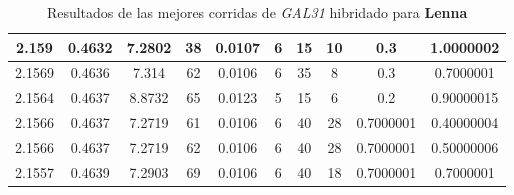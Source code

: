 \begin{table}[h!]
\begin{center}
\begin{tabular}{|c|c|c|c|c|c|c|c|c|c|}
        \hline
        \hline
            2.159 & 0.4632  & 7.2802 & 38 & 0.0107 & 6 & 15 & 10 & 0.3 & 1.0000002\\
        \hline
        \hline
            2.1569 & 0.4636  & 7.314 & 62 & 0.0106 & 6 & 35 & 8 & 0.3 & 0.7000001\\
        \hline
        \hline
            2.1564 & 0.4637  & 8.8732 & 65 & 0.0123 & 5 & 15 & 6 & 0.2 & 0.90000015\\
        \hline
        \hline
            2.1566 & 0.4637  & 7.2719 & 61 & 0.0106 & 6 & 40 & 28 & 0.7000001 & 0.40000004\\
        \hline
        \hline
            2.1566 & 0.4637  & 7.2719 & 62 & 0.0106 & 6 & 40 & 28 & 0.7000001 & 0.50000006\\
        \hline
        \hline
            2.1557 & 0.4639  & 7.2903 & 69 & 0.0106 & 6 & 40 & 18 & 0.7000001 & 0.7000001\\
        \hline
        \end{tabular}
        \caption{Resultados de las mejores corridas de \emph{GAL31} hibridado para {\bf Lenna}}
        \label{tb:tableGAL31}
    \end{center}
\end{table}
